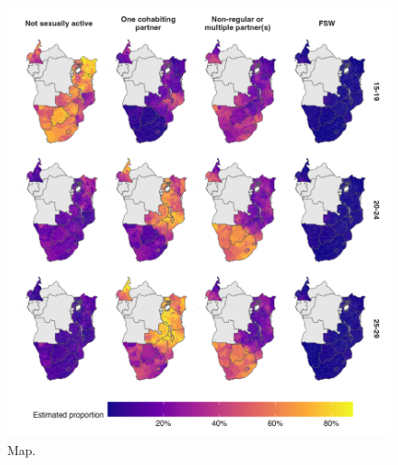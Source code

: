 \documentclass[a4paper, nobind]{templates/ociamthesis}
\begin{document}
\begin{figure}

{\centering \includegraphics[width=0.95\linewidth]{resources/multi-agyw/20230627-144735-3da88508/depends/3p1-continental-map} 

}

\caption{Map.}\label{fig:3p1-continental-map}
\end{figure}
\end{document}
